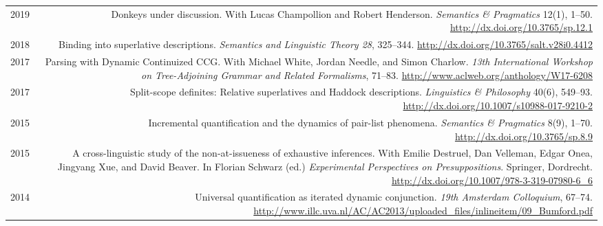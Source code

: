 \documentclass[12pt]{article}
\newcommand{\doi}[1]{\url{http://dx.doi.org/#1}}
\newcommand{\flag}{}
\begin{document}
\begin{longtable}{LR}
  \flag%
  2019  & Donkeys under discussion.\newline
          With Lucas Champollion and Robert Henderson.\newline
          \textit{Semantics \& Pragmatics} 12(1), 1--50.\newline
          \doi{10.3765/sp.12.1}\\
  2018  & Binding into superlative descriptions.\newline
          \textit{Semantics and Linguistic Theory 28}, 325--344.\newline
          \doi{10.3765/salt.v28i0.4412}\\
  2017  & Parsing with Dynamic Continuized CCG.\newline
          With Michael White, Jordan Needle, and Simon Charlow.\newline
          \textit{13th International Workshop on Tree-Adjoining Grammar and
          Related Formalisms}, 71--83.\newline
          \url{http://www.aclweb.org/anthology/W17-6208}\\
  \flag%
  2017  & Split-scope definites: Relative superlatives and Haddock
          descriptions.\newline
          \textit{Linguistics \& Philosophy} 40(6), 549--93.\newline
          \doi{10.1007/s10988-017-9210-2}\\
  \flag%
  2015  & Incremental quantification and the dynamics of pair-list phenomena.\newline
          \textit{Semantics \& Pragmatics} 8(9), 1--70.\newline
          \doi{10.3765/sp.8.9}\\
  2015  & A cross-linguistic study of the non-at-issueness of exhaustive
          inferences.\newline
          With Emilie Destruel, Dan Velleman, Edgar Onea, Jingyang Xue, and
          David Beaver.\newline
          In Florian Schwarz (ed.) \textit{Experimental Perspectives on
          Presuppositions}. Springer, Dordrecht.\newline
          \doi{10.1007/978-3-319-07980-6_6}\\ %
  2014  & Universal quantification as iterated dynamic conjunction.\newline
          \textit{19th Amsterdam Colloquium}, 67--74.\newline
          \url{http://www.illc.uva.nl/AC/AC2013/uploaded_files/inlineitem/09_Bumford.pdf}\\

\end{longtable}
\end{document}
